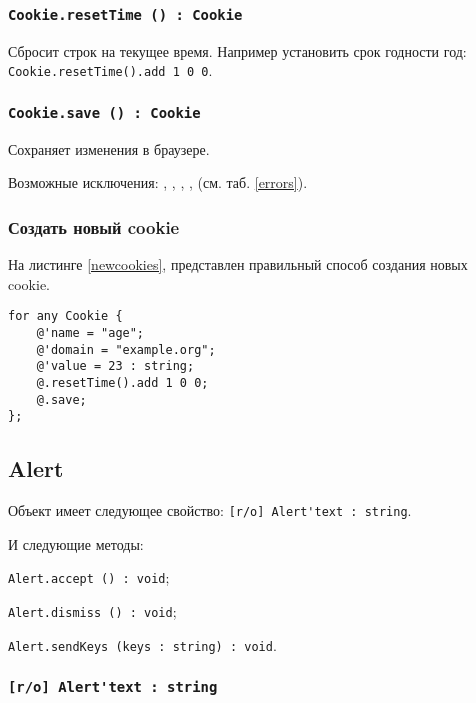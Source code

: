 \subsubsection{\lstinline|Cookie.resetTime () : Cookie|}

Сбросит строк на текущее время. Например установить срок годности год: \lstinline|Cookie.resetTime().add 1 0 0|.

\subsubsection{\lstinline|Cookie.save () : Cookie|}

Сохраняет изменения в браузере.

Возможные исключения: , , , ,  (см. таб. \ref{errors}).

\subsubsection{Создать новый cookie}

На листинге \ref{newcookies}, представлен правильный способ создания новых cookie.

\begin{lstlisting}[caption=Создания новых cookie, label=newcookies]
for any Cookie {
	@'name = "age";
	@'domain = "example.org";
	@'value = 23 : string;
	@.resetTime().add 1 0 0;
	@.save;
};
\end{lstlisting}


\subsection{{\color{orange} Alert}}

Объект \alert{} имеет следующее свойство: \lstinline|[r/o] Alert'text : string|.

И следующие методы:
\begin{icItems}
	\item \lstinline|Alert.accept () : void|;
	\item \lstinline|Alert.dismiss () : void|;
	\item \lstinline|Alert.sendKeys (keys : string) : void|.
\end{icItems}

\subsubsection{\lstinline|[r/o] Alert'text : string|}

